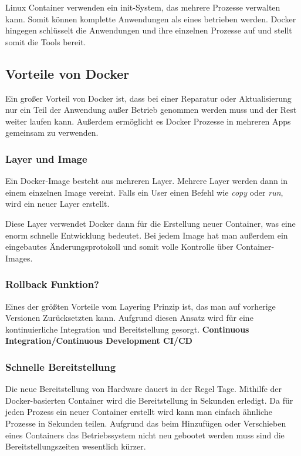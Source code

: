 Linux Container verwenden ein init-System, das mehrere Prozesse verwalten kann. Somit können
komplette Anwendungen als eines betrieben werden. Docker hingegen schlüsselt die Anwendungen und
ihre einzelnen Prozesse auf und stellt somit die Tools bereit.

\subsection{Vorteile von Docker}
Ein großer Vorteil von Docker ist, dass bei einer Reparatur oder
Aktualisierung nur ein Teil der Anwendung außer Betrieb genommen werden muss und
der Rest weiter laufen kann. Außerdem ermöglicht es Docker Prozesse in mehreren
Apps gemeinsam zu verwenden.

\subsubsection{Layer und Image}
Ein Docker-Image besteht aus mehreren Layer. Mehrere Layer werden dann
in einem einzelnen Image vereint. Falls ein User einen Befehl wie \textit{copy}
oder \textit{run}, wird ein neuer Layer erstellt.

Diese Layer verwendet Docker dann für die Erstellung neuer Container, was eine enorm schnelle
Entwicklung bedeutet. Bei jedem Image hat man außerdem ein eingebautes Änderungsprotokoll
und somit volle Kontrolle über Container-Images.

\subsubsection{Rollback Funktion?}
Eines der größten Vorteile vom Layering Prinzip ist, das man auf vorherige Versionen
Zurücksetzten kann. Aufgrund diesen Ansatz wird für eine kontinuierliche Integration und
Bereitstellung gesorgt. \textbf{Continuous Integration/Continuous Development CI/CD}

\subsubsection{Schnelle Bereitstellung}
Die neue Bereitstellung von Hardware dauert in der Regel Tage. Mithilfe der Docker-basierten
Container wird die Bereitstellung in Sekunden erledigt. Da für jeden Prozess ein neuer Container
erstellt wird kann man einfach ähnliche Prozesse in Sekunden teilen. Aufgrund das beim Hinzufügen
oder Verschieben eines Containers das Betriebssystem nicht neu gebootet werden muss sind die
Bereitstellungszeiten wesentlich kürzer.

\cite{Docker}
\label{Docker}